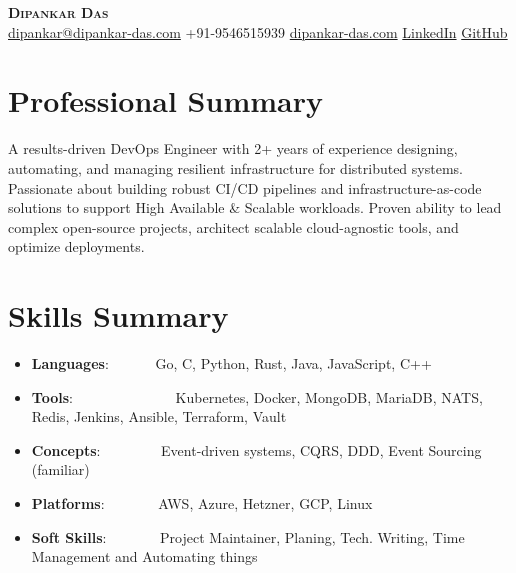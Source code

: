\documentclass[a4paper,20pt]{article}
\newcommand{\resumeItem}[2]{
  \item\small{
    \textbf{#1}{: #2 \vspace{-2pt}}
  }
}
\newcommand{\resumeSubItem}[2]{\resumeItem{#1}{#2}\vspace{-3pt}}
\newcommand{\resumeSubHeadingListStart}{\begin{itemize}[leftmargin=*]}
\newcommand{\resumeSubHeadingListEnd}{\end{itemize}}
\begin{document}
\begin{center}
    \textbf{\Huge \scshape Dipankar Das} \\ \vspace{2pt}
    \href{mailto:dipankar@dipankar-das.com}{dipankar@dipankar-das.com} \quad \Large\textbar \quad
    +91-9546515939 \quad \Large\textbar \quad
    \href{https://dipankar-das.com/}{dipankar-das.com} \quad \Large\textbar \quad
    \href{https://www.linkedin.com/in/dipankar-das-1324b6206/}{LinkedIn} \quad \Large\textbar \quad
    \href{https://github.com/dipankardas011}{GitHub}
\end{center}


\section{Professional Summary}
\vspace{5pt}
\small{A results-driven DevOps Engineer with 2+ years of experience designing, automating, and managing resilient infrastructure for distributed systems. Passionate about building robust CI/CD pipelines and infrastructure-as-code solutions to support High Available \& Scalable workloads. Proven ability to lead complex open-source projects, architect scalable cloud-agnostic tools, and optimize deployments.}
\vspace{5pt}


\section{Skills Summary}
	\resumeSubHeadingListStart
        \resumeSubItem{Languages}{~~~~~~Go, C, Python, Rust, Java, JavaScript, C++}
        \resumeSubItem{Tools}{~~~~~~~~~~~~~~Kubernetes, Docker, MongoDB, MariaDB, NATS, Redis, Jenkins, Ansible, Terraform, Vault}
        \resumeSubItem{Concepts}{~~~~~~~~Event-driven systems, CQRS, DDD, Event Sourcing (familiar)}
        \resumeSubItem{Platforms}{~~~~~~~AWS, Azure, Hetzner, GCP, Linux}
        \resumeSubItem{Soft Skills}{~~~~~~~Project Maintainer, Planing, Tech. Writing, Time Management and Automating things}
    \resumeSubHeadingListEnd
\vspace{-5pt}


\end{document}

